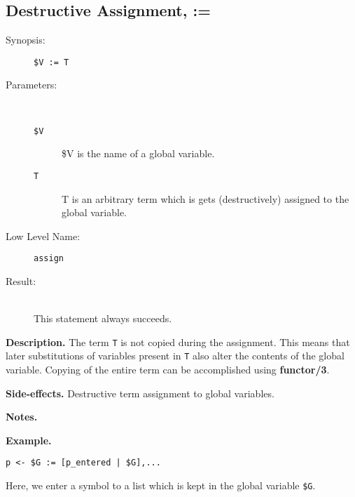 %
%
%
\subsection{Destructive Assignment, :=}

\begin{description}
\item[Synopsis:]
	{\tt \$V := T}
\item[Parameters:]\ \\[-0.5cm]
	\begin{description}
	\item[{\tt \$V}]

\$V is the name of a global variable.
	\item[{\tt T}]

T is an arbitrary term which is gets (destructively) assigned
to the global variable.


	\end{description}
\item[Low Level Name:]
	{\tt assign}
\item[Result:]\ \\
This statement always succeeds.
\end{description}

\vspace*{0.5cm}
\noindent
{\bf Description.}
The term {\tt T} is not copied during the assignment.
This means that later substitutions of variables present in {\tt T}
also alter the contents of the global variable.
Copying of the entire term can be accomplished using
{\bf functor/3}.

\vspace*{0.5cm}
\noindent
{\bf Side-effects.}
Destructive term assignment to global variables.

\vspace*{0.5cm}
\noindent
{\bf Notes.}

\vspace*{0.5cm}
\noindent
{\bf Example.}
\begin{verbatim}
p <- $G := [p_entered | $G],...
\end{verbatim}

Here, we enter a symbol to a list which is kept in the global
variable {\tt \$G}.




